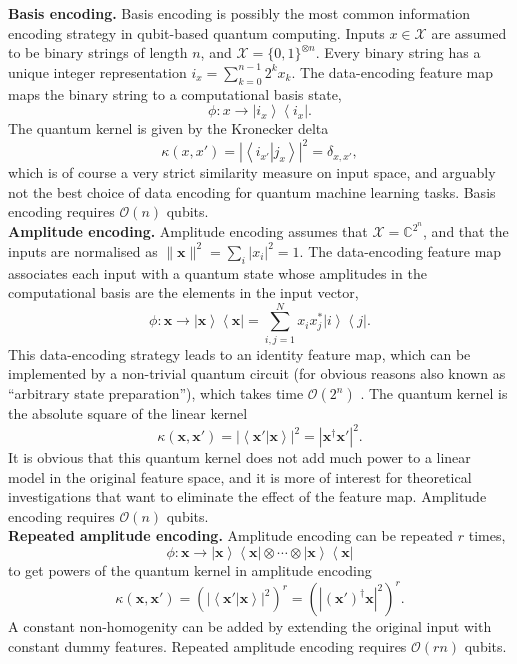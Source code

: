 \documentclass[aps, reprint, onecolumn, nofootinbib, longbibliography]{revtex4-2}
\newcommand{\ket}[1]{\ensuremath{\left| #1 \right \rangle}}
\newcommand{\bra}[1]{\ensuremath{\left \langle #1 \right |}}
\newcommand{\braket}[2]{\ensuremath{\left\langle #1\left|#2 \right.\right\rangle}}
\newcommand{\ketbra}[2]{\ket{#1}\!\bra{#2}}
\begin{document}
\textbf{Basis encoding.} Basis encoding is possibly the most common information encoding strategy in qubit-based quantum computing. Inputs $x \in \mathcal{X}$ are assumed to be binary strings of length $n$, and $\mathcal{X} = \{0, 1\}^{\otimes n}$. Every binary string has a unique integer representation $i_x = \sum_{k=0}^{n-1} 2^k x_k$. The data-encoding feature map maps the binary string to a computational basis state,
\begin{equation}\phi: x \rightarrow \ketbra{i_x}{i_x}. \end{equation}
The quantum kernel is given by the Kronecker delta
\begin{equation} \kappa(x,x') = |\braket{i_{x'}}{j_{x}}|^2 = \delta_{x,x'}, \end{equation}
which is of course a very strict similarity measure on input space, and arguably not the best choice of data encoding for quantum machine learning tasks. Basis encoding requires $\mathcal{O}(n)$ qubits.\\

\textbf{Amplitude encoding.} Amplitude encoding assumes that $\mathcal{X} = \mathbb{C}^{2^n}$, and that the inputs are normalised as $\|\mathbf{x}\|^2 = \sum_i |x_i|^2 = 1$. The data-encoding feature map associates each input with a quantum state whose amplitudes in the computational basis are the elements in the input vector,
\begin{equation}\phi: \mathbf{x} \rightarrow  \ketbra{\mathbf{x}}{\mathbf{x}} =  \sum_{i,j=1}^N x_i x^*_j \ketbra{i}{j}. \end{equation}
This data-encoding strategy leads to an identity feature map, which can be implemented by a non-trivial quantum circuit (for obvious reasons also known as ``arbitrary state preparation''), which takes time $\mathcal{O}(2^n)$ \citep{iten2016quantum}. The quantum kernel is the absolute square of the linear kernel
\begin{equation} \kappa(\mathbf{x},\mathbf{x}') = |\braket{\mathbf{x}'}{\mathbf{x}}|^2 = |\mathbf{x}^{\dagger}\mathbf{x}'|^2. \end{equation}
It is obvious that this quantum kernel does not add much power to a linear model in the original feature space, and it is more of interest for theoretical investigations that want to eliminate the effect of the feature map. Amplitude encoding requires $\mathcal{O}(n)$ qubits.\\
 
\textbf{Repeated amplitude encoding.} Amplitude encoding can be repeated $r$ times, 
\begin{equation} \phi: \mathbf{x} \rightarrow \ketbra{\mathbf{x}}{\mathbf{x}}  \otimes \cdots \otimes \ketbra{\mathbf{x}}{\mathbf{x}}  \end{equation}
to get powers of the quantum kernel in amplitude encoding
\begin{equation} \kappa(\mathbf{x},\mathbf{x}') = (|\braket{\mathbf{x}'}{\mathbf{x}}|^2 )^r = (|(\mathbf{x}')^{\dagger}\mathbf{x}|^2)^r. \end{equation}
A constant non-homogenity can be added by extending the original input with constant dummy features. Repeated amplitude encoding requires $\mathcal{O}(r n)$ qubits.\\
\end{document}
